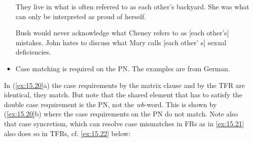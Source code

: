 \documentclass[output=paper]{langsci/langscibook}
\begin{document}
\begin{refcontext}
\begin{itemize}
\ea\label{ex:15.18}
    \ea They live in what is often referred to as each other's backyard.
    \ex She was what can only be interpreted as proud of herself.
    \z
\z

\ea\label{ex:15.19}
    \ea Bush would never acknowledge what Cheney refers to as [each other’s] mistakes.
    \ex John hates to discuss what Mary calls [each other’ s] sexual deficiencies.
    \z
\z

    \item Case matching is required on the \gls{PN}. The examples are from German.

    \ea\label{ex:15.20}
    \z
\z
\end{itemize}
In (\ref{ex:15.20}a) the case requirements by the matrix clause and by the \gls{TFR} are
identical, they match. But note that the shared element that has to satisfy the
double case requirement is the \gls{PN}, not the \emph{wh}{}-word. This is
shown by (\ref{ex:15.20}b) where the case requirements on the \gls{PN} do not match. Note
also that case syncretism, which can resolve case mismatches in \glspl{FR} as
in \eqref{ex:15.21} also does so in \glspl{TFR}, cf. \eqref{ex:15.22} below:


\end{refcontext}
\end{document}
